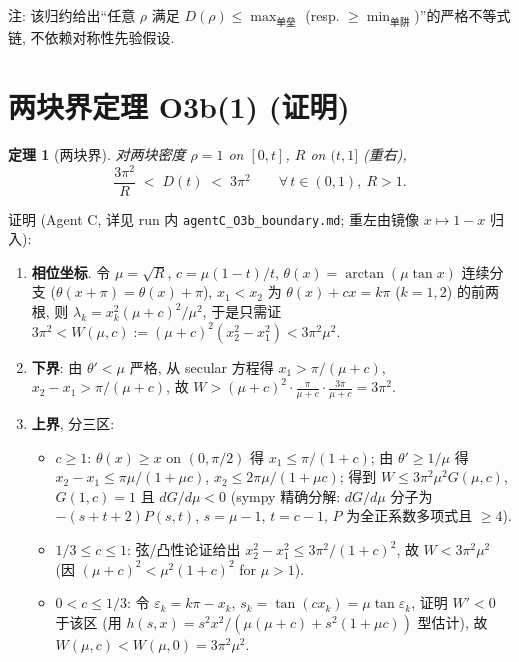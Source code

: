 \documentclass[UTF8]{ctexart}
\newtheorem{theorem}{定理}[section]
\begin{document}
注: 该归约给出``任意 $\rho$ 满足
$D(\rho) \le \max_{\text{单垒}}$ (resp. $\ge \min_{\text{单阱}}$)''的严格不等式链,
不依赖对称性先验假设.

\section{两块界定理 O3b(1) (证明)}

\begin{theorem}[两块界]
对两块密度 $\rho = 1$ on $[0,t]$, $R$ on $(t,1]$ (重右),
\begin{equation}
	\frac{3\pi^2}{R} \;<\; D(t) \;<\; 3\pi^2 \qquad \forall\, t\in(0,1),\ R>1.
\end{equation}
\end{theorem}

证明 (Agent C, 详见 run 内 \texttt{agentC\_O3b\_boundary.md}; 重左由镜像 $x\mapsto1-x$ 归入):
\begin{enumerate}
	\item \textbf{相位坐标}. 令 $\mu=\sqrt R$, $c = \mu(1-t)/t$,
		$\theta(x)=\arctan(\mu\tan x)$ 连续分支 ($\theta(x+\pi)=\theta(x)+\pi$),
		$x_1<x_2$ 为 $\theta(x) + cx = k\pi$ ($k=1,2$) 的前两根, 则
		$\lambda_k = x_k^2(\mu+c)^2/\mu^2$, 于是只需证
		$3\pi^2 < W(\mu,c) := (\mu+c)^2(x_2^2-x_1^2) < 3\pi^2\mu^2$.
	\item \textbf{下界}: 由 $\theta' < \mu$ 严格, 从 secular 方程得
		$x_1 > \pi/(\mu+c)$, $x_2 - x_1 > \pi/(\mu+c)$, 故
		$W > (\mu+c)^2\cdot\frac{\pi}{\mu+c}\cdot\frac{3\pi}{\mu+c} = 3\pi^2$.
	\item \textbf{上界}, 分三区:
		\begin{itemize}
			\item $c \ge 1$: $\theta(x)\ge x$ on $(0,\pi/2)$ 得
				$x_1 \le \pi/(1+c)$; 由 $\theta'\ge 1/\mu$ 得
				$x_2 - x_1 \le \pi\mu/(1+\mu c)$, $x_2 \le 2\pi\mu/(1+\mu c)$;
				得到 $W \le 3\pi^2\mu^2 G(\mu,c)$,
				$G(1,c)=1$ 且 $dG/d\mu < 0$ (sympy 精确分解:
				$dG/d\mu$ 分子为 $-(s+t+2)P(s,t)$, $s=\mu-1$, $t=c-1$,
				$P$ 为全正系数多项式且 $\ge 4$).
			\item $1/3 \le c \le 1$: 弦/凸性论证给出
				$x_2^2-x_1^2 \le 3\pi^2/(1+c)^2$, 故
				$W < 3\pi^2\mu^2$ (因 $(\mu+c)^2 < \mu^2(1+c)^2$ for $\mu>1$).
			\item $0 < c \le 1/3$: 令 $\varepsilon_k = k\pi - x_k$,
				$s_k = \tan(cx_k) = \mu\tan\varepsilon_k$, 证明 $W' < 0$ 于该区
				(用 $h(s,x)=s^2x^2/(\mu(\mu+c)+s^2(1+\mu c))$ 型估计), 故
				$W(\mu,c) < W(\mu,0) = 3\pi^2\mu^2$.
		\end{itemize}
\end{enumerate}
\end{document}
